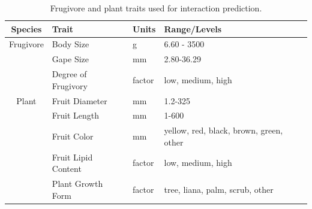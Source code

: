 \documentclass[openacc]{rsproca_new}%
\begin{document}
\begin{table}[!h]
\caption{Frugivore and plant traits used for interaction prediction.}
\label{tab:traits}
\begin{tabular}{clll} 
 \hline
 Species & Trait & Units & Range/Levels \\  
 \hline
 \hline
Frugivore & Body Size &  g &  6.60 - 3500 \\
& Gape Size &   mm  & 2.80-36.29  \\  
& Degree of Frugivory & factor   &  low, medium, high \\  
Plant & Fruit Diameter &  mm  & 1.2-325  \\
& Fruit Length &  mm  &  1-600 \\
& Fruit Color &  mm  & yellow, red, black, brown, green, other \\
& Fruit Lipid Content & factor   &  low, medium, high  \\ 
& Plant Growth Form &   factor  &  tree, liana, palm, scrub, other \\ 
 \hline
\end{tabular}
\end{table}


\clearpage 
\end{document}
